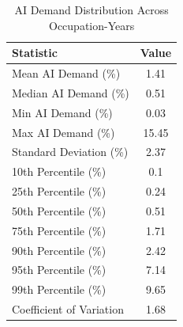 \begin{table}[htbp]
\caption{AI Demand Distribution Across Occupation-Years}
\label{tab:ai_demand_distribution}
\begin{tabular}{lc}
\hline\hline
Statistic & Value \\
\hline
Mean AI Demand (\%) & 1.41 \\
Median AI Demand (\%) & 0.51 \\
Min AI Demand (\%) & 0.03 \\
Max AI Demand (\%) & 15.45 \\
Standard Deviation (\%) & 2.37 \\
10th Percentile (\%) & 0.1 \\
25th Percentile (\%) & 0.24 \\
50th Percentile (\%) & 0.51 \\
75th Percentile (\%) & 1.71 \\
90th Percentile (\%) & 2.42 \\
95th Percentile (\%) & 7.14 \\
99th Percentile (\%) & 9.65 \\
Coefficient of Variation & 1.68 \\
\hline\hline
\end{tabular}
\end{table}
